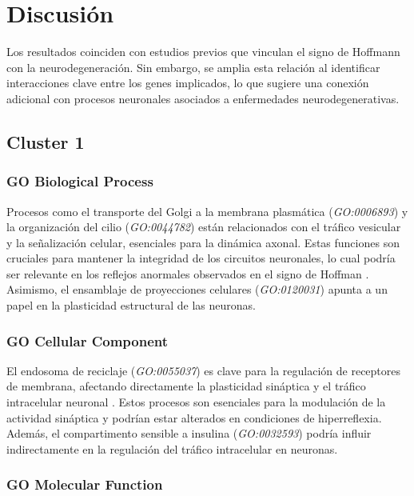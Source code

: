 \section{Discusión}

Los resultados coinciden con estudios previos que vinculan el signo de Hoffmann con la neurodegeneración. Sin embargo, se amplia esta relación al identificar interacciones clave entre los genes implicados, lo que sugiere una conexión adicional con procesos neuronales asociados a enfermedades neurodegenerativas.


\subsection{Cluster 1}

\subsubsection{GO Biological Process}

Procesos como el transporte del Golgi a la membrana plasmática (\textit{GO:0006893}) y la organización del cilio (\textit{GO:0044782}) están relacionados con el tráfico vesicular y la señalización celular, esenciales para la dinámica axonal. Estas funciones son cruciales para mantener la integridad de los circuitos neuronales, lo cual podría ser relevante en los reflejos anormales observados en el signo de Hoffman \cite{cells11182773}. Asimismo, el ensamblaje de proyecciones celulares (\textit{GO:0120031}) apunta a un papel en la plasticidad estructural de las neuronas.

\subsubsection{GO Cellular Component}

El endosoma de reciclaje (\textit{GO:0055037}) es clave para la regulación de receptores de membrana, afectando directamente la plasticidad sináptica y el tráfico intracelular neuronal \cite{RozesSalvador2020}. Estos procesos son esenciales para la modulación de la actividad sináptica y podrían estar alterados en condiciones de hiperreflexia. Además, el compartimento sensible a insulina (\textit{GO:0032593}) podría influir indirectamente en la regulación del tráfico intracelular en neuronas.

\subsubsection{GO Molecular Function}

